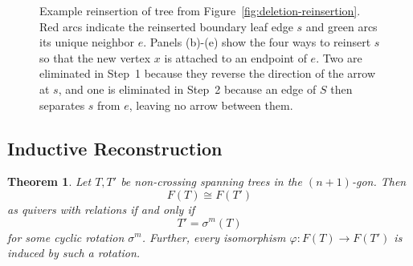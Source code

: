 \documentclass[12pt]{amsart}
\newtheorem{thm}{Theorem}[section]
\theoremstyle{definition}
\theoremstyle{remark}
\numberwithin{equation}{section}
\begin{document}
\begin{figure}[h]
\caption{Example reinsertion of tree from Figure~\ref{fig:deletion-reinsertion}. Red arcs indicate the reinserted boundary leaf edge $s$ and green arcs its unique neighbor $e$. Panels (b)-(e) show the four ways to reinsert $s$ so that the new vertex $x$ is attached to an endpoint of $e$. Two are eliminated in Step~1 because they reverse the direction of the arrow at $s$, and one is eliminated in Step~2 because an edge of $S$ then separates $s$ from $e$, leaving no arrow between them.}
\label{fig:reinsertion-cases}
\end{figure}

\subsection{Inductive Reconstruction}

\begin{thm}\label{thm:comb}
Let \(T,T'\) be non-crossing spanning trees in the \((n+1)\)-gon. Then
\[
F(T)\cong F(T')
\]
as quivers with relations if and only if
\[
T'=\sigma^m(T)
\]
for some cyclic rotation \(\sigma^m\). Further, every isomorphism \(\varphi: F(T) \to F(T')\) is induced by such a rotation.
\end{thm}
\end{document}
